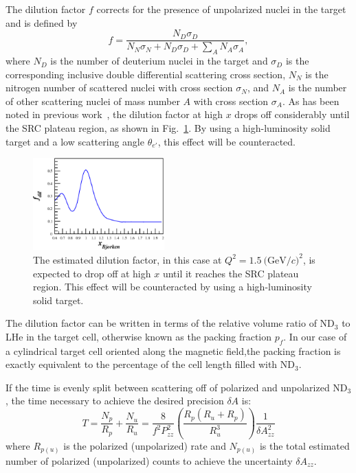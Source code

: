 The dilution factor $f$ corrects for the presence of unpolarized nuclei in the target and is defined by
\begin{equation}
f=\frac{N_D\sigma_D}{N_N\sigma_N+N_D\sigma_D+\sum\limits_{A} N_A\sigma_A},
\end{equation}
where $N_D$ is the number of deuterium nuclei in the target and $\sigma_D$ is the corresponding inclusive double differential scattering cross 
section, $N_N$ is the nitrogen number of scattered nuclei with cross section $\sigma_N$, and $N_A$ is the number of other scattering nuclei of mass number $A$ with cross section $\sigma_A$. As has been noted in previous work~\cite{Frankfurt:1988nt}, the dilution factor at high $x$ drops off considerably until the SRC plateau region, as shown in Fig.~\ref{fdil}. By using a high-luminosity solid target and a low scattering angle $\theta_{e'}$, this effect will be counteracted.

\begin{figure}
\begin{center}
\includegraphics[width=0.45\textwidth]{figs/fdil_q2_15.eps}
\caption{\label{fdil}The estimated dilution factor, in this case at $Q^2=1.5 \mathrm{~(GeV}/c)^2$, is expected to drop off at high $x$ until it reaches the SRC plateau region. This effect will be counteracted by using a high-luminosity solid target.}
\end{center}
\end{figure}

The dilution factor can be written in terms of the relative volume ratio of ND$_3$ to LHe in the target cell, otherwise known as the packing fraction $p_f$.  
In our case of a cylindrical target cell oriented along the magnetic field,the packing fraction is exactly equivalent to the percentage of the cell length filled with ND$_3$.  

If the time is evenly split between scattering off of polarized and unpolarized ND$_3$, the time necessary to achieve the desired precision $\delta A$ is:
\begin{equation}
T=\frac{N_p}{R_p}+\frac{N_u}{R_u}=\frac{8}{f^2P_{zz}^2}\left(\frac{R_p(R_u+R_p)}{R_u^3}\right)\frac{1}{\delta A_{zz}^2}
\end{equation} 
where $R_{p(u)}$ is the polarized (unpolarized) rate and $N_{p(u)}$ is the total estimated 
number of polarized (unpolarized) counts to achieve the uncertainty $\delta A_{zz}$.  

